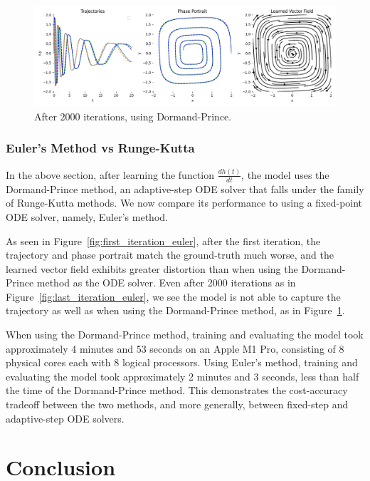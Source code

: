 \documentclass[11pt]{article}
\begin{document}
\begin{figure}
  \centering
  \includegraphics*[width=\linewidth]{099.png}
  \caption{After 2000 iterations, using Dormand-Prince.}
  \label{fig:last_iteration}
\end{figure}

\subsubsection{Euler's Method vs Runge-Kutta}

In the above section, after learning the function $\frac{dh(t)}{dt}$, the model uses the Dormand-Prince method, an adaptive-step ODE solver that falls under the family of Runge-Kutta methods. We now compare its performance to using a fixed-point ODE solver, namely, Euler's method.

As seen in Figure~\ref{fig:first_iteration_euler}, after the first iteration, the trajectory and phase portrait match the ground-truth much worse, and the learned vector field exhibits greater distortion than when using the Dormand-Prince method as the ODE solver. Even after 2000 iterations as in Figure~\ref{fig:last_iteration_euler}, we see the model is not able to capture the trajectory as well as when using the Dormand-Prince method, as in Figure~\ref{fig:last_iteration}.

When using the Dormand-Prince method, training and evaluating the model took approximately 4 minutes and 53 seconds on an Apple M1 Pro, consisting of 8 physical cores each with 8 logical processors. Using Euler's method, training and evaluating the model took approximately 2 minutes and 3 seconds, less than half the time of the Dormand-Prince method. This demonstrates the cost-accuracy tradeoff between the two methods, and more generally, between fixed-step and adaptive-step ODE solvers.

\section{Conclusion}
\end{document}
